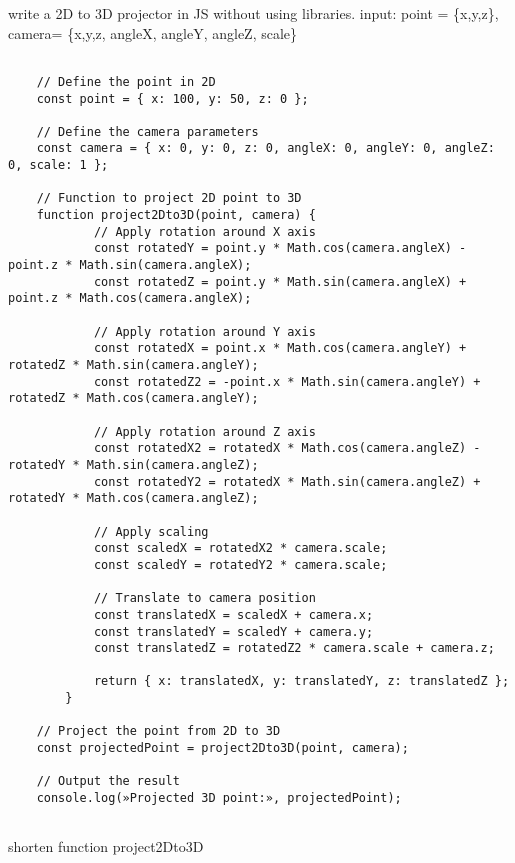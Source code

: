 \begin{leftBox}
	write a 2D to 3D projector in JS without using libraries. input:  point = \{x,y,z\}, camera= \{x,y,z, angleX, angleY, angleZ, scale\}
\end{leftBox}

\begin{lstlisting}[numbers=none]
	
	// Define the point in 2D
	const point = { x: 100, y: 50, z: 0 };

	// Define the camera parameters
	const camera = { x: 0, y: 0, z: 0, angleX: 0, angleY: 0, angleZ: 0, scale: 1 };

	// Function to project 2D point to 3D
	function project2Dto3D(point, camera) {
			// Apply rotation around X axis
			const rotatedY = point.y * Math.cos(camera.angleX) - point.z * Math.sin(camera.angleX);
			const rotatedZ = point.y * Math.sin(camera.angleX) + point.z * Math.cos(camera.angleX);

			// Apply rotation around Y axis
			const rotatedX = point.x * Math.cos(camera.angleY) + rotatedZ * Math.sin(camera.angleY);
			const rotatedZ2 = -point.x * Math.sin(camera.angleY) + rotatedZ * Math.cos(camera.angleY);

			// Apply rotation around Z axis
			const rotatedX2 = rotatedX * Math.cos(camera.angleZ) - rotatedY * Math.sin(camera.angleZ);
			const rotatedY2 = rotatedX * Math.sin(camera.angleZ) + rotatedY * Math.cos(camera.angleZ);

			// Apply scaling
			const scaledX = rotatedX2 * camera.scale;
			const scaledY = rotatedY2 * camera.scale;

			// Translate to camera position
			const translatedX = scaledX + camera.x;
			const translatedY = scaledY + camera.y;
			const translatedZ = rotatedZ2 * camera.scale + camera.z;

			return { x: translatedX, y: translatedY, z: translatedZ };
		}

	// Project the point from 2D to 3D
	const projectedPoint = project2Dto3D(point, camera);

	// Output the result
	console.log(»Projected 3D point:», projectedPoint);
	
\end{lstlisting}

\begin{leftBox}
	shorten function project2Dto3D
\end{leftBox}

